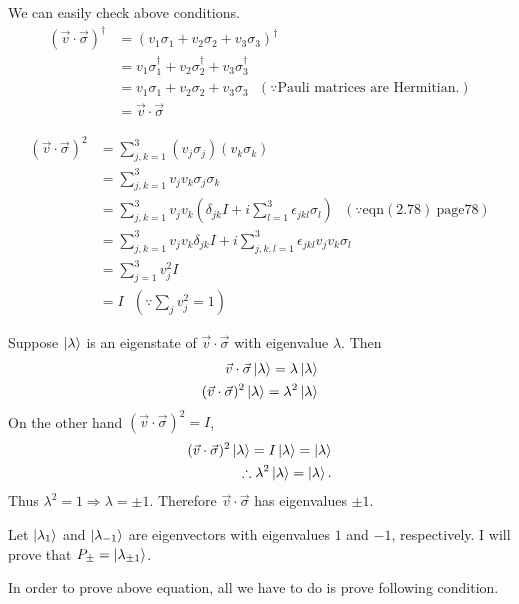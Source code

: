 	We can easily check above conditions.
	\begin{align*}
	(\vec{v} \cdot \vec{\sigma})^\dagger &= (v_1 \sigma_1 + v_2 \sigma_2 + v_3 \sigma_3)^\dagger\\
	&= v_1 \sigma_1^\dagger + v_2 \sigma_2^\dagger + v_3 \sigma_3^\dagger\\
	&= v_1 \sigma_1 + v_2 \sigma_2 + v_3 \sigma_3~~~(\because \text{Pauli matrices are Hermitian.})\\
	&= \vec{v} \cdot \vec{\sigma}
	\end{align*}

	\begin{align*}
	(\vec{v} \cdot \vec{\sigma})^2 &= \sum_{j,k=1}^3 (v_j \sigma_j)  (v_k \sigma_k)\\
	&= \sum_{j,k=1}^3 v_j v_k \sigma_j \sigma_k\\
	&= \sum_{j,k=1}^3 v_j v_k \left(\delta_{jk}I + i \sum_{l=1}^3 \epsilon_{jkl}\sigma_l \right) ~~~(\because \text{eqn}(2.78)~ \text{page} 78)\\
	&= \sum_{j,k=1}^3 v_j v_k \delta_{jk}I  + i \sum_{j,k,l=1}^3 \epsilon_{jkl} v_j v_k \sigma_l\\
	&= \sum_{j=1}^3 v_j^2 I\\
	&= I ~~~\left(\because \sum_j v_j^2 = 1 \right)
	\end{align*}



		Suppose $\ket{\lambda}$ is an eigenstate of $\vec{v} \cdot \vec{\sigma}$ with eigenvalue $\lambda$. Then
		\begin{align*}
		\vec{v} \cdot \vec{\sigma} \ket{\lambda} = \lambda \ket{\lambda}\\
		(\vec{v} \cdot \vec{\sigma})^2 \ket{\lambda} = \lambda^2 \ket{\lambda}
		\end{align*}
		On the other hand $(\vec{v} \cdot \vec{\sigma})^2 = I$,
		\begin{align*}
		(\vec{v} \cdot \vec{\sigma})^2 \ket{\lambda} = I \ket{\lambda} = \ket{\lambda}\\
		\therefore \lambda^2\ket{\lambda} = \ket{\lambda}.
		\end{align*}
		Thus $\lambda^2 = 1 \Rightarrow \lambda = \pm 1$. Therefore $\vec{v} \cdot \vec{\sigma}$ has eigenvalues $\pm 1$.

		Let $\ket{\lambda_1}$ and $\ket{\lambda_{-1}}$ are eigenvectors with eigenvalues $1$ and $-1$, respectively.
		I will prove that $P_{\pm} = \ket{\lambda_{\pm 1}}$.

		In order to prove above equation, all we have to do is prove following condition. 


